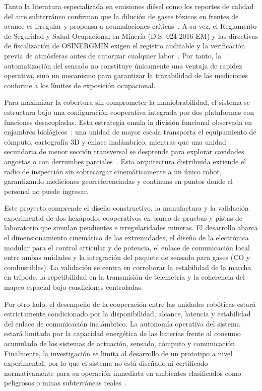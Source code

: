 Tanto la literatura especializada en emisiones diésel como los reportes de calidad del aire subterráneo confirman que la dilución de gases tóxicos en frentes de avance es irregular y propensa a acumulaciones críticas~\cite{TorresSalazar2021_Diesel, Cortez2016_GEI_Minas, Cepa2023_sensors}. A su vez, el Reglamento de Seguridad y Salud Ocupacional en Minería (D.S. 024-2016-EM) y las directivas de fiscalización de OSINERGMIN exigen el registro auditable y la verificación previa de atmósferas antes de autorizar cualquier labor~\cite{OSINERGMIN_BoletinGSM_Ventilacion_2020, MINEM_DS024_2016, MINEM_Yanaquihua_2023}. Por tanto, la automatización del sensado no constituye únicamente una ventaja de rapidez operativa, sino un mecanismo para garantizar la trazabilidad de las mediciones conforme a los límites de exposición ocupacional.

Para maximizar la cobertura sin comprometer la maniobrabilidad, el sistema se estructura bajo una configuración cooperativa integrada por dos plataformas con funciones desacopladas. Esta estrategia emula la división funcional observada en enjambres biológicos~\cite{InsectInspired_2020}: una unidad de mayor escala transporta el equipamiento de cómputo, cartografía 3D y enlace inalámbrico, mientras que una unidad secundaria de menor sección transversal se desprende para explorar cavidades angostas o con derrumbes parciales~\cite{FlappingFlight_2021}. Esta arquitectura distribuida extiende el radio de inspección sin sobrecargar cinemáticamente a un único robot, garantizando mediciones georreferenciadas y continuas en puntos donde el personal no puede ingresar.



Este proyecto comprende el diseño constructivo, la manufactura y la validación experimental de dos hexápodos cooperativos en banco de pruebas y pistas de laboratorio que simulan pendientes e irregularidades mineras. El desarrollo abarca el dimensionamiento cinemático de las extremidades, el diseño de la electrónica modular para el control articular y de potencia, el enlace de comunicación local entre ambas unidades y la integración del paquete de sensado para gases ($\text{CO}$ y combustibles). La validación se centra en corroborar la estabilidad de la marcha en trípode, la repetibilidad en la transmisión de telemetría y la coherencia del mapeo espacial bajo condiciones controladas.

Por otro lado, el desempeño de la cooperación entre las unidades robóticas estará estrictamente condicionado por la disponibilidad, alcance, latencia y estabilidad del enlace de comunicación inalámbrico. La autonomía operativa del sistema estará limitada por la capacidad energética de las baterías frente al consumo acumulado de los sistemas de actuación, sensado, cómputo y comunicación. Finalmente, la investigación se limita al desarrollo de un prototipo a nivel experimental, por lo que el sistema no está diseñado ni certificado normativamente para su operación inmediata en ambientes clasificados como peligrosos o minas subterráneas reales~\cite{OSINERGMIN_DS024_Compilado, OSINERGMIN_BoletinGSM_2020}.
